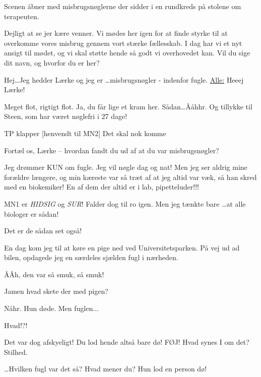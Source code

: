 \documentclass[a4paper,12pt]{article}
\begin{document}
\begin{sketch}


\scene Scenen åbner med misbrugsnøglerne der sidder i en rundkreds på stolene om terapeuten.

 Dejligt at se jer kære venner. Vi mødes her igen for at
finde styrke til at overkomme vores misbrug gennem vort stærke
fællesskab. I dag har vi et nyt ansigt til mødet, og vi skal støtte
hende så godt vi overhovedet kan. Vil du sige dit navn, og hvorfor du
er her?

 Hej\ldots  Jeg hedder Lærke og jeg er \ldots  misbrugsnøgler - indenfor fugle.
\underline{Alle:} Heeej Lærke!

 Meget flot, rigtigt flot. Ja, du får lige et kram her. Sådan\ldots  Ååhhr.
 Og tillykke til Steen, som
har været nøglefri i 27 dage!

\scene TP klapper
[henvendt til MN2] Det skal nok komme 

 Fortæl os, Lærke -- hvordan fandt du ud af at du var
misbrugsnøgler?

 Jeg drømmer KUN om fugle. Jeg vil nøgle dag og nat! Men jeg
ser aldrig mine forældre længere, og min kæreste var så træt af at jeg
altid var væk, så han skred med en biokemiker! En af dem der altid er
i lab, pipetteluder!!!

\scene MN1 er \emph{HIDSIG} og \emph{SUR}! Falder dog til ro igen.
 Men jeg tænkte bare \ldots  at alle biologer er sådan! 

 Det er de sådan set også!

 En dag kom jeg til at køre en pige ned ved
Universitetsparken. På vej ud ad bilen, opdagede jeg en særdeles
sjælden fugl i nærheden.

 ÅÅh, den var så smuk, så smuk!

 Jamen hvad skete der med pigen?

 Nåhr. Hun døde. Men fuglen...

 Hvad!?! 

 Det var dog afskyeligt! Du lod hende altså bare dø! FØJ! Hvad synes I om det?
\scene Stilhed.

 \ldots Hvilken fugl var det så?
 Hvad mener du? Hun lod en person dø!


\end{sketch}
\end{document}

